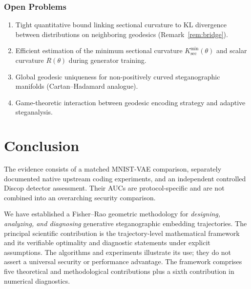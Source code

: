 \documentclass[a4paper,fleqn]{cas-dc}
\begin{document}
\subsubsection{Open Problems}

\begin{enumerate}
  \item Tight quantitative bound linking sectional curvature to KL
        divergence between distributions on neighboring geodesics
        (Remark~\ref{rem:bridge}).
  \item Efficient estimation of the minimum sectional curvature
        $K_{\sec}^{\min}(\theta)$ and scalar curvature $R(\theta)$
        during generator training.
  \item Global geodesic uniqueness for non-positively curved
        steganographic manifolds (Cartan--Hadamard analogue).
  \item Game-theoretic interaction between geodesic encoding strategy
        and adaptive steganalysis.
\end{enumerate}





\section{Conclusion}
\label{sec:conclusion}


The evidence consists of a matched MNIST-VAE comparison, separately
documented native upstream coding experiments, and an independent controlled
Discop detector assessment. Their AUCs are protocol-specific and are not
combined into an overarching security comparison.

We have established a Fisher--Rao geometric methodology for
\emph{designing, analyzing, and diagnosing} generative steganographic
embedding trajectories. The principal scientific contribution is the
trajectory-level mathematical framework and its verifiable optimality
and diagnostic statements under explicit assumptions. The algorithms
and experiments illustrate its use; they do not assert a universal
security or performance advantage. The framework comprises five theoretical and methodological
contributions plus a sixth contribution in numerical diagnostics.
\end{document}

